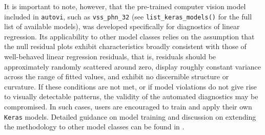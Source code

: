 \documentclass[
doublespace,
  times]{anzsauth}
\newenvironment{Shaded}{\begin{snugshade}}{\end{snugshade}}
\newcommand{\AttributeTok}[1]{\textcolor[rgb]{0.40,0.45,0.13}{#1}}
\newcommand{\DecValTok}[1]{\textcolor[rgb]{0.68,0.00,0.00}{#1}}
\newcommand{\FloatTok}[1]{\textcolor[rgb]{0.68,0.00,0.00}{#1}}
\newcommand{\FunctionTok}[1]{\textcolor[rgb]{0.28,0.35,0.67}{#1}}
\newcommand{\NormalTok}[1]{\textcolor[rgb]{0.00,0.23,0.31}{#1}}
\newcommand{\OtherTok}[1]{\textcolor[rgb]{0.00,0.23,0.31}{#1}}
\newcommand{\SpecialCharTok}[1]{\textcolor[rgb]{0.37,0.37,0.37}{#1}}
\newcommand{\StringTok}[1]{\textcolor[rgb]{0.13,0.47,0.30}{#1}}
\begin{document}
It is important to note, however, that the pre-trained computer vision
model included in \texttt{autovi}, such as \texttt{vss\_phn\_32} (see
\texttt{list\_keras\_models()} for the full list of available models),
was developed specifically for diagnostics of linear regression. Its
applicability to other model classes relies on the assumption that the
null residual plots exhibit characteristics broadly consistent with
those of well-behaved linear regression residuals, that is, residuals
should be approximately randomly scattered around zero, display roughly
constant variance across the range of fitted values, and exhibit no
discernible structure or curvature. If these conditions are not met, or
if model violations do not give rise to visually detectable patterns,
the validity of the automated diagnostics may be compromised. In such
cases, users are encouraged to train and apply their own \texttt{Keras}
models. Detailed guidance on model training and discussion on extending
the methodology to other model classes can be found in
\citet{li2024automated}.

\begin{Shaded}
\end{Shaded}
\end{document}

